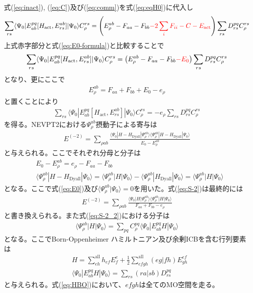 \documentclass[11pt,pra,aps]{revtex4}
\newcommand{\red}[1]{\textcolor{red}{#1}}
\begin{document}
式(\ref{eq:inact}), (\ref{eq:C})及び(\ref{eq:comm})を式(\ref{eq:eqH0})に代入し
\begin{align}
  \sum_{rs} \langle\Psi_0|E^{pq}_{ab}[H_\text{act},E_{rs}^{ab}]|\Psi_0\rangle C_\rho^{rs}=\left(E_{\rho}^{ab}-F_{aa}-F_{bb}\red{-2\sum_i F_{ii}-C-E_\text{act}}\right)\sum_{rs} D^{pq}_{rs} C_\rho^{rs} \label{eq:eqH0_2}
\end{align}
上式赤字部分と式(\ref{eq:E0-formula})と比較することで
\begin{align}
  \sum_{rs} \langle\Psi_0|E^{pq}_{ab}[H_\text{act},E_{rs}^{ab}]|\Psi_0\rangle C_\rho^{rs}=\left(E_{\rho}^{ab}-F_{aa}-F_{bb}\red{-E_0}\right)\sum_{rs} D^{pq}_{rs} C_\rho^{rs} \label{eq:eqH0_2}
\end{align}
となり、更にここで
\begin{align}
  E_{\rho}^{ab}=F_{aa}+F_{bb}+E_0-e_\rho
\end{align}
と置くことにより
\begin{align}
  \sum_{rs} \langle\Psi_0|E^{pq}_{ab}[H_\text{act},E_{rs}^{ab}]|\Psi_0\rangle C_\rho^{rs}=-e_\rho\sum_{rs} D^{pq}_{rs} C_\rho^{rs} \label{eq:eqH0_3}
\end{align}
を得る。NEVPT2における$\Psi_\rho^{ab}$摂動子による寄与は
\begin{align}
  E^{(-2)}=\sum_{\rho ab} \frac{\langle\Psi_0|H-H_\text{Dyall}|\Psi_{\rho}^{ab}\rangle\langle\Psi_{\rho}^{ab}|H-H_\text{Dyall}|\Psi_0\rangle}{E_0-E_\rho^{ab}} \label{eq:S-2}
\end{align}
と与えられる。ここでそれぞれ分母と分子は
\begin{align}
  &E_0-E_{\rho}^{ab}=e_\rho-F_{aa}-F_{bb} \\
  &\langle\Psi_{\rho}^{ab}|H-H_\text{Dyall}|\Psi_0\rangle=\langle\Psi_{\rho}^{ab}|H|\Psi_0\rangle-\langle\Psi_{\rho}^{ab}|H_\text{Dyall}|\Psi_0\rangle=\langle\Psi_{\rho}^{ab}|H|\Psi_0\rangle \label{eq:num}
\end{align}
となる。ここで式(\ref{eq:E0})及び$\langle\Psi_{\rho}^{ab}|\Psi_0\rangle=0$を用いた。式(\ref{eq:S-2})は最終的には
\begin{align}
  E^{(-2)}=\sum_{\rho ab} \frac{\langle\Psi_0|H|\Psi_{\rho}^{ab}\rangle\langle\Psi_{\rho}^{ab}|H|\Psi_0\rangle}{F_{aa}+F_{bb}-e_\rho} \label{eq:S-2_2}
\end{align}
と書き換えられる。また式(\ref{eq:S-2_2})における分子は
\begin{align}
  \langle\Psi_{\rho}^{ab}|H|\Psi_0\rangle=\sum_{pq}C_\rho^{pq} \langle\Psi_0|E_{ab}^{pq}H|\Psi_0\rangle
\end{align}
となる。ここでBorn-Oppenheimer ハミルトニアン及び余剰ICBを含む行列要素は
\begin{align}
  &H=\sum_{eh}^\text{all} h_{ef} E^e_f+\frac{1}{2}\sum_{efgh}^\text{all} (eg|fh) E^{ef}_{gh} \label{eq:HBO} \\
  &\langle\Psi_0|E_{ab}^{pq}H|\Psi_0\rangle=\sum_{rs} (ra|sb) D^{pq}_{rs} \label{eq:numerator}
\end{align}
と与えられる。式(\ref{eq:HBO})において、$efgh$は全てのMO空間を走る。
\end{document}
